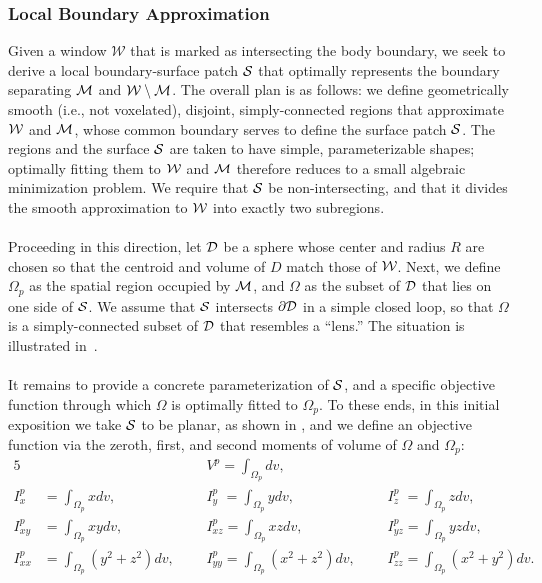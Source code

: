 \subsubsection{Local Boundary Approximation}

Given a window $\mathcal{W}$ that is marked as intersecting the body boundary, we seek to derive a local boundary-surface patch $\mathcal{S}$ that optimally represents the boundary separating $\mathcal{M}$ and $\mathcal{W} \setminus \mathcal{M}$.  The overall plan is as follows: we define geometrically smooth (i.e., not voxelated), disjoint, simply-connected regions that approximate $\mathcal{W}$ and $\mathcal{M}$, whose common boundary serves to define the surface patch $\mathcal{S}$.  The regions and the surface $\mathcal{S}$ are taken to have simple, parameterizable shapes; optimally fitting them to $\mathcal{W}$ and $\mathcal{M}$ therefore reduces to a small algebraic minimization problem.  We require that $\mathcal{S}$ be non-intersecting, and that it divides the smooth approximation to $\mathcal{W}$ into exactly two subregions. \\ \\
%
Proceeding in this direction, let $\mathcal{D}$ be a sphere whose center and radius $R$ are chosen so that the centroid and volume of $D$ match those of $\mathcal{W}$.  Next, we define $\Omega_p$ as the spatial region occupied by $\mathcal{M}$, and $\Omega$ as the subset of $\mathcal{D}$ that lies on one side of $\mathcal{S}$.  We assume that $\mathcal{S}$ intersects $\partial \mathcal{D}$ in a simple closed loop, so that $\Omega$ is a simply-connected subset of $\mathcal{D}$ that resembles a ``lens.''  The situation is illustrated in~. \\ \\
%
It remains to provide a concrete parameterization of $\mathcal{S}$, and a specific objective function through which $\Omega$ is optimally fitted to $\Omega_p$.  To these ends, in this initial exposition we take $\mathcal{S}$ to be planar, as shown in , and we define an objective function via the zeroth, first, and second moments of volume of $\Omega$ and $\Omega_p$: 
\begin{alignat}{5}
&{} &&V^p = \int_{\Omega_p}dv, &&{} \\
I_{x\phantom{z}}^p &= \int_{\Omega_p}xdv, &&I_{y\phantom{z}}^p = \int_{\Omega_p}ydv, &&I_{z\phantom{z}}^p = \int_{\Omega_p}zdv, \\
I^p_{xy} &= \int_{\Omega_p}xydv, &&I^p_{xz} = \int_{\Omega_p}xzdv, &&I^p_{yz} = \int_{\Omega_p}yzdv, \\
I^p_{xx} &= \int_{\Omega_p}(y^2 + z^2)dv, \text{\ \ \ \ \ \ }&&I^p_{yy} = \int_{\Omega_p}(x^2 + z^2)dv, \text{\ \ \ \ \ \ }&&I^p_{zz} = \int_{\Omega_p}(x^2 + y^2)dv.
\end{alignat}
